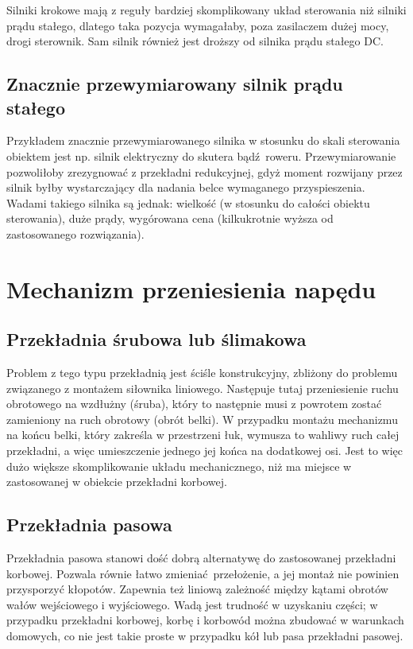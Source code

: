 Silniki krokowe mają z reguły bardziej skomplikowany układ sterowania niż silniki prądu stałego, dlatego taka pozycja wymagałaby, poza zasilaczem dużej mocy, drogi sterownik. Sam silnik również jest droższy od silnika prądu stałego DC.

\subsection{Znacznie przewymiarowany silnik prądu stałego}

Przykładem znacznie przewymiarowanego silnika w stosunku do skali sterowania obiektem jest np. silnik elektryczny do skutera bądź roweru. Przewymiarowanie pozwoliłoby zrezygnować z przekładni redukcyjnej, gdyż moment rozwijany przez silnik byłby wystarczający dla nadania belce wymaganego przyspieszenia. Wadami takiego silnika są jednak: wielkość (w stosunku do całości obiektu sterowania), duże prądy, wygórowana cena (kilkukrotnie wyższa od zastosowanego rozwiązania).


\section{Mechanizm przeniesienia napędu}

\subsection{Przekładnia śrubowa lub ślimakowa}

Problem z tego typu przekładnią jest ściśle konstrukcyjny, zbliżony do problemu związanego z montażem siłownika liniowego. Następuje tutaj przeniesienie ruchu obrotowego na wzdłużny (śruba), który to następnie musi z powrotem zostać zamieniony na ruch obrotowy (obrót belki). W przypadku montażu mechanizmu na końcu belki, który zakreśla w przestrzeni łuk, wymusza to wahliwy ruch całej przekładni, a więc umieszczenie jednego jej końca na dodatkowej osi. Jest to więc dużo większe skomplikowanie układu mechanicznego, niż ma miejsce w zastosowanej w obiekcie przekładni korbowej.

\subsection{Przekładnia pasowa}

Przekładnia pasowa stanowi dość dobrą alternatywę do zastosowanej przekładni korbowej. Pozwala równie łatwo zmieniać przełożenie, a jej montaż nie powinien przysporzyć kłopotów. Zapewnia też liniową zależność między kątami obrotów wałów wejściowego i wyjściowego. Wadą jest trudność w uzyskaniu części; w przypadku przekładni korbowej, korbę i korbowód można zbudować w warunkach domowych, co nie jest takie proste w przypadku kół lub pasa przekładni pasowej.